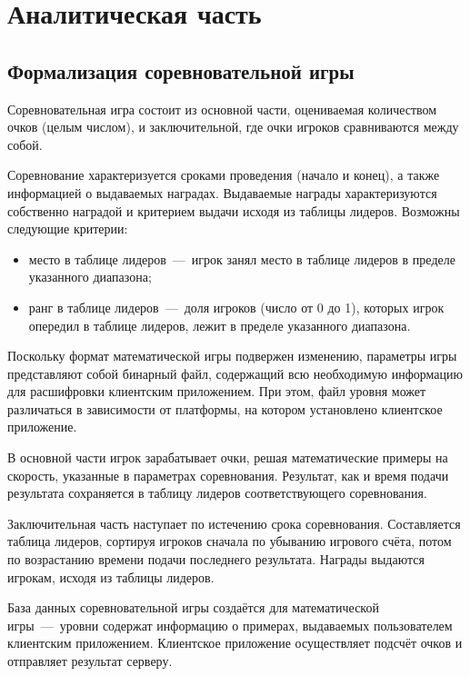 \chapter{Аналитическая часть}

\section{Формализация соревновательной игры}


Соревновательная игра состоит из основной части, оцениваемая количеством очков (целым числом), и заключительной, где очки игроков сравниваются между собой.

Соревнование характеризуется сроками проведения (начало и конец), а также информацией о выдаваемых наградах. Выдаваемые награды характеризуются собственно наградой и критерием выдачи исходя из таблицы лидеров. Возможны следующие критерии:
\begin{itemize}
	\item место в таблице лидеров~---~игрок занял место в таблице лидеров в пределе указанного диапазона;
	\item ранг в таблице лидеров~---~доля игроков (число от 0 до 1), которых игрок опередил в таблице лидеров, лежит в пределе указанного диапазона.
\end{itemize}
Поскольку формат математической игры подвержен изменению, параметры игры представляют собой бинарный файл, содержащий всю необходимую информацию для расшифровки клиентским приложением. При этом, файл уровня может различаться в зависимости от платформы, на котором установлено клиентское приложение.



В основной части игрок зарабатывает очки, решая математические примеры на скорость, указанные в параметрах соревнования. Результат, как и время подачи результата сохраняется в таблицу лидеров соответствующего соревнования.

Заключительная часть наступает по истечению срока соревнования. Составляется таблица лидеров, сортируя игроков сначала по убыванию игрового счёта, потом по возрастанию времени подачи последнего результата. Награды выдаются игрокам, исходя из таблицы лидеров. 

База данных соревновательной игры создаётся для математической игры~---~уровни содержат информацию о примерах, выдаваемых пользователем клиентским приложением. Клиентское приложение осуществляет подсчёт очков и отправляет результат серверу.

